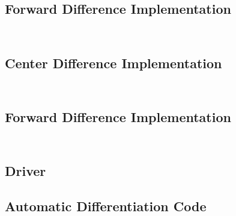 \documentclass{article}
\begin{document}
\subsection{Forward Difference Implementation}\label{sec:fd_code}
\inputminted[xleftmargin=10pt,linenos]{matlab}{fd_obj_grad.m}
\inputminted[xleftmargin=10pt,linenos]{matlab}{fd_con_grad.m}

\subsection{Center Difference Implementation}\label{sec:cd_code}
\inputminted[xleftmargin=10pt,linenos]{matlab}{cd_obj_grad.m}
\inputminted[xleftmargin=10pt,linenos]{matlab}{cd_con_grad.m}

\subsection{Forward Difference Implementation}\label{sec:cs_code}
\inputminted[xleftmargin=10pt,linenos]{matlab}{cs_obj_grad.m}
\inputminted[xleftmargin=10pt,linenos]{matlab}{cs_con_grad.m}
\subsection{Driver}
\subsection{Automatic Differentiation Code}\label{ADcode}


\end{document}
